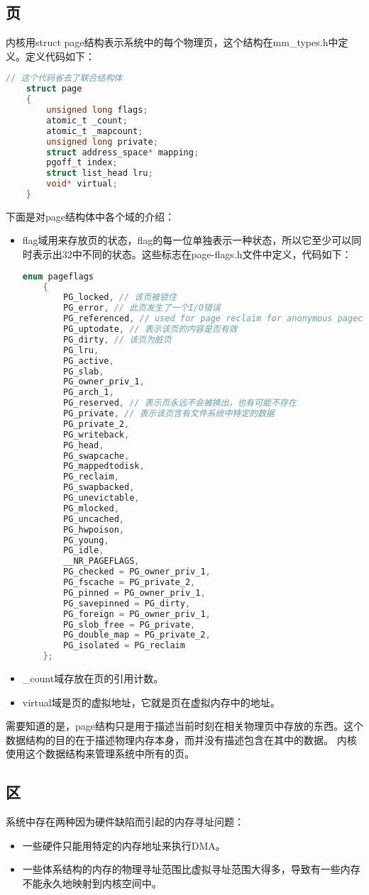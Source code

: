 \documentclass[a4paper,left=2.5cm,right=2.5cm,11pt]{article}
\begin{document}
\subsection{页}
	内核用struct page结构表示系统中的每个物理页，这个结构在mm\_types.h中定义。定义代码如下：
	\begin{lstlisting}[language = C]
	// 这个代码省去了联合结构体
	struct page
	{
		unsigned long flags;
		atomic_t _count;
		atomic_t _mapcount;
		unsigned long private;
		struct address_space* mapping;
		pgoff_t index;
		struct list_head lru;
		void* virtual;
	}
	\end{lstlisting}

	下面是对page结构体中各个域的介绍：
	\begin{itemize}
		\item flag域用来存放页的状态，flag的每一位单独表示一种状态，所以它至少可以同时表示出32中不同的状态。这些标志在page-flags.h文件中定义，代码如下：
		\begin{lstlisting}[language = C]
	enum pageflags
	{
		PG_locked, // 该页被锁住
		PG_error, // 此页发生了一个I/O错误
		PG_referenced, // used for page reclaim for anonymous pagecache
		PG_uptodate, // 表示该页的内容是否有效
		PG_dirty, // 该页为脏页
		PG_lru,
		PG_active,
		PG_slab,
		PG_owner_priv_1,
		PG_arch_1,
		PG_reserved, // 表示页永远不会被换出，也有可能不存在
		PG_private, // 表示该页含有文件系统中特定的数据 
		PG_private_2,
		PG_writeback,
		PG_head,
		PG_swapcache,
		PG_mappedtodisk,
		PG_reclaim,
		PG_swapbacked,
		PG_unevictable,
		PG_mlocked,
		PG_uncached,
		PG_hwpoison,
		PG_young,
		PG_idle,
		__NR_PAGEFLAGS,
		PG_checked = PG_owner_priv_1,
		PG_fscache = PG_private_2,
		PG_pinned = PG_owner_priv_1,
		PG_savepinned = PG_dirty,
		PG_foreign = PG_owner_priv_1,
		PG_slob_free = PG_private,
		PG_double_map = PG_private_2,
		PG_isolated = PG_reclaim
	};
		\end{lstlisting}

		\item \_count域存放在页的引用计数。
		\item virtual域是页的虚拟地址，它就是页在虚拟内存中的地址。
	\end{itemize}

	需要知道的是，page结构只是用于描述当前时刻在相关物理页中存放的东西。这个数据结构的目的在于描述物理内存本身，而并没有描述包含在其中的数据。
	内核使用这个数据结构来管理系统中所有的页。\par

\subsection{区}
	系统中存在两种因为硬件缺陷而引起的内存寻址问题：
	\begin{itemize}
		\item 一些硬件只能用特定的内存地址来执行DMA。
		\item 一些体系结构的内存的物理寻址范围比虚拟寻址范围大得多，导致有一些内存不能永久地映射到内核空间中。
	\end{itemize}
\end{document}
